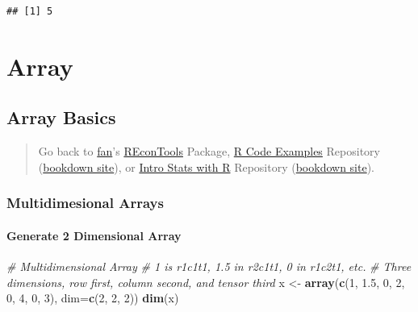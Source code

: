 \documentclass[
]{book}
\newenvironment{Shaded}{\begin{snugshade}}{\end{snugshade}}
\newcommand{\CommentTok}[1]{\textcolor[rgb]{0.56,0.35,0.01}{\textit{#1}}}
\newcommand{\DataTypeTok}[1]{\textcolor[rgb]{0.13,0.29,0.53}{#1}}
\newcommand{\DecValTok}[1]{\textcolor[rgb]{0.00,0.00,0.81}{#1}}
\newcommand{\FloatTok}[1]{\textcolor[rgb]{0.00,0.00,0.81}{#1}}
\newcommand{\KeywordTok}[1]{\textcolor[rgb]{0.13,0.29,0.53}{\textbf{#1}}}
\newcommand{\NormalTok}[1]{#1}
\newcommand{\StringTok}[1]{\textcolor[rgb]{0.31,0.60,0.02}{#1}}
\begin{document}
\begin{verbatim}
## [1] 5
\end{verbatim}

\hypertarget{array}{%
\section{Array}\label{array}}

\hypertarget{array-basics}{%
\subsection{Array Basics}\label{array-basics}}

\begin{quote}
Go back to \href{http://fanwangecon.github.io/}{fan}'s \href{https://fanwangecon.github.io/REconTools/}{REconTools} Package, \href{https://fanwangecon.github.io/R4Econ/}{R Code Examples} Repository (\href{https://fanwangecon.github.io/R4Econ/bookdown}{bookdown site}), or \href{https://fanwangecon.github.io/Stat4Econ/}{Intro Stats with R} Repository (\href{https://fanwangecon.github.io/Stat4Econ/bookdown}{bookdown site}).
\end{quote}

\hypertarget{multidimesional-arrays}{%
\subsubsection{Multidimesional Arrays}\label{multidimesional-arrays}}

\hypertarget{generate-2-dimensional-array}{%
\paragraph{Generate 2 Dimensional Array}\label{generate-2-dimensional-array}}

\begin{Shaded}
\begin{Highlighting}[]
\CommentTok{\# Multidimensional Array}
\CommentTok{\# 1 is r1c1t1, 1.5 in r2c1t1, 0 in r1c2t1, etc.}
\CommentTok{\# Three dimensions, row first, column second, and tensor third}
\NormalTok{x \textless{}{-}}\StringTok{ }\KeywordTok{array}\NormalTok{(}\KeywordTok{c}\NormalTok{(}\DecValTok{1}\NormalTok{, }\FloatTok{1.5}\NormalTok{, }\DecValTok{0}\NormalTok{, }\DecValTok{2}\NormalTok{, }\DecValTok{0}\NormalTok{, }\DecValTok{4}\NormalTok{, }\DecValTok{0}\NormalTok{, }\DecValTok{3}\NormalTok{), }\DataTypeTok{dim=}\KeywordTok{c}\NormalTok{(}\DecValTok{2}\NormalTok{, }\DecValTok{2}\NormalTok{, }\DecValTok{2}\NormalTok{))}
\KeywordTok{dim}\NormalTok{(x)}
\end{Highlighting}
\end{Shaded}
\end{document}
